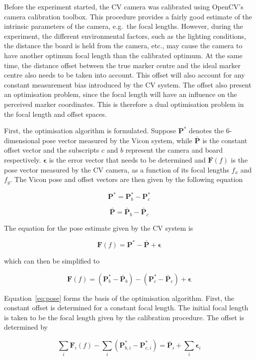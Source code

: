 Before the experiment started, the CV camera was calibrated using OpenCV's camera calibration toolbox. This procedure provides a fairly good estimate of the intrinsic parameters of the camera, e.g.\ the focal lengths. However, during the experiment, the different environmental factors, such as the lighting conditions, the distance the board is held from the camera, etc., may cause the camera to have another optimum focal length than the calibrated optimum. At the same time, the distance offset between the true marker centre and the ideal marker centre also needs to be taken into account. This offset will also account for any constant measurement bias introduced by the CV system. The offset also present an optimisation problem, since the focal length will have an influence on the perceived marker coordinates. This is therefore a dual optimisation problem in the focal length and offset spaces.   

First, the optimisation algorithm is formulated. Suppose $\bm{P}^*$ denotes the 6-dimensional pose vector measured by the Vicon system, while $\bar{\bm{P}}$ is the constant offset vector and the subscripts $c$ and $b$ represent the camera and board respectively. $\bm{\epsilon}$ is the error vector that needs to be determined and $\bm{F}(f)$ is the pose vector measured by the CV camera, as a function of its focal lengths $f_x$ and $f_y$. The Vicon pose and offset vectors are then given by the following equation

\[
  \bm{P}^* = \bm{P}^*_b - \bm{P}^*_c
\]

\[
  \bar{\bm{P}} = \bar{\bm{P}}_b - \bar{\bm{P}}_c
\]

The equation for the pose estimate given by the CV system is 

\[
  \bm{F}(f) = \bm{P}^* - \bar{\bm{P}} + \bm{\epsilon}
\]

which can then be simplified to 

\begin{equation}
  \label{eq:pose}
  \bm{F}(f) = (\bm{P}^*_b - \bar{\bm{P}}_b) - (\bm{P}^*_c - \bar{\bm{P}}_c) + \bm{\epsilon}
\end{equation}

Equation~\ref{eq:pose} forms the basis of the optimisation algorithm. First, the constant offset is determined for a constant focal length. The initial focal length is taken to be the focal length given by the calibration procedure. The offset is determined by 

\[
  \sum\limits_i \bm{F}_i(f) - \sum\limits_i(\bm{P}^*_{b,i} - \bm{P}^*_{c, i}) = \bar{\bm{P}}_{i} + \sum\limits_i\bm{\epsilon}_i
\]

